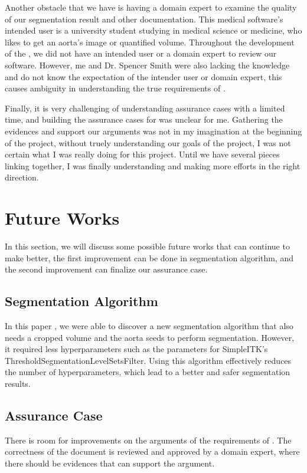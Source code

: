 Another obstacle that we have is having a domain expert to examine the quality of our segmentation result and other documentation. This medical software's intended user is a university student studying in medical science or medicine, who likes to get an aorta's image or quantified volume. Throughout the development of the \progname{}, we did not have an intended user or a domain expert to review our software. However, me and Dr. Spencer Smith were also lacking the knowledge and do not know the expectation of the intender user or domain expert, this causes ambiguity in understanding the true requirements of \progname{}.

Finally, it is very challenging of understanding assurance cases with a limited time, and building the assurance cases for \progname{} was unclear for me. Gathering the evidences and support our arguments was not in my imagination at the beginning of the project, without truely understanding our goals of the project, I was not certain what I was really doing for this project. Until we have several pieces linking together, I was finally understanding and making more efforts in the right direction. 

\section{Future Works}

In this section, we will discuss some possible future works that can continue to make \progname{} better, the first improvement can be done in segmentation algorithm, and the second improvement can finalize our assurance case.

\subsection{Segmentation Algorithm}

In this paper \cite{6346433}, we were able to discover a new segmentation algorithm that also needs a cropped volume and the aorta seeds to perform segmentation. However, it required less hyperparameters such as the parameters for SimpleITK's ThresholdSegmentationLevelSetsFilter. Using this algorithm effectively reduces the number of hyperparameters, which lead to a better and safer segmentation results.

\subsection{Assurance Case}

There is room for improvements on the arguments of the requirements of \progname{}. The correctness of the document is reviewed and approved by a domain expert, where there should be evidences that can support the argument.